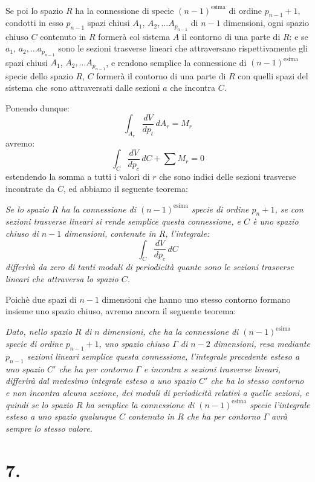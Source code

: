 \documentclass{article}
\begin{document}
Se poi lo spazio $R$ ha la connessione di specie $(n-1)^{\text{esima}}$ di ordine $p_{n-1}+1$, condotti in esso $p_{n-1}$ spazi chiusi $A_{1}$, $A_{2},\ldots A_{p_{n-1}}$ di $n-1$ dimensioni, ogni spazio chiuso $C$ contenuto in $R$ formerà col sistema $A$ il contorno di una parte di $R$: e se $a_{1}$, $a_{2},\ldots a_{p_{n-1}}$ sono le sezioni trasverse lineari che attraversano rispettivamente gli spazi chiusi $A_{1}$, $A_{2},\ldots A_{p_{n-1}}$, e rendono semplice la connessione di $(n-1)^{\text{esima}}$ specie dello spazio $R$, $C$ formerà il contorno di una parte di $R$ con quelli spazi del sistema che sono attraversati dalle sezioni $a$ che incontra $C$.

Ponendo dunque:
\[ \int_{A_{r}} \frac{dV}{dp_{t}}\,dA_{r} = M_{r} \]
avremo:
\[ \int_{C} \frac{dV}{dp_{c}}\,dC + \sum M_{r} = 0 \]
estendendo la somma a tutti i valori di $r$ che sono indici delle sezioni trasverse incontrate da $C$, ed abbiamo il seguente teorema:

\emph{Se lo spazio $R$ ha la connessione di $(n-1)^{\text{esima}}$ specie di ordine $p_{n}+1$, se con sezioni trasverse lineari si rende semplice questa connessione, e $C$ è uno spazio chiuso di $n-1$ dimensioni, contenute in $R$, l'integrale:}
\[ \int_{C} \frac{dV}{dp_{c}}\,dC \]
\emph{differirà da zero di tanti moduli di periodicità quante sono le sezioni trasverse lineari che attraversa lo spazio $C$.}

Poichè due spazi di $n-1$ dimensioni che hanno uno stesso contorno formano insieme uno spazio chiuso, avremo ancora il seguente teorema:


\emph{Dato, nello spazio $R$ di $n$ dimensioni, che ha la connessione di $(n-1)^{\text{esima}}$ specie di ordine $p_{n-1}+1$, uno spazio chiuso $\Gamma$ di $n-2$ dimensioni, resa mediante $p_{n-1}$ sezioni lineari semplice questa connessione, l'integrale precedente esteso a uno spazio $C'$ che ha per contorno $\Gamma$ e incontra $s$ sezioni trasverse lineari, differirà dal medesimo integrale esteso a uno spazio $C'$ che ha lo stesso contorno e non incontra alcuna sezione, dei moduli di periodicità relativi a quelle sezioni, e quindi se lo spazio $R$ ha semplice la connessione di $(n-1)^{\text{esima}}$ specie l'integrale esteso a uno spazio qualunque $C$ contenuto in $R$ che ha per contorno $\Gamma$ avrà sempre lo stesso valore.}

\section*{7.}
\end{document}

